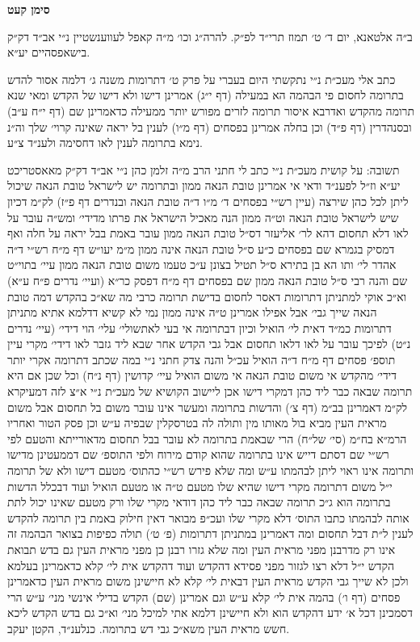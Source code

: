 \documentclass[12pt, openany]{book}
\newcommand{\chapname}{}
\newcommand{\newchap}[1]{
	\addcontentsline{toc}{chapter}{#1}
	\renewcommand{\chapname}{#1}
		\begin{center}
			\textbf{%
\fontsize{16pt}{16pt}\selectfont
				#1}
		\end{center}
}
\begin{document}
\newchap{סימן קעט}
\begin{multicols}{2}
ב״ה אלטאנא, יום ד׳ ט׳ תמוז תרי״ד לפ״ק. להרה״ג וכו׳ מ״ה קאפל לעווענשטיין נ״י אב״ד דק״ק בישאפסהיים יע״א.\\\vspace{0pt}

כתב אלי מעכ״ת נ״י נתקשתי היום בעברי על פרק ט׳ דתרומות משנה ג׳ דלמה אסור להדש בתרומה לחסום פי הבהמה הא במעילה (דף י״ג) אמרינן דישו ולא דישו של הקדש ומאי שנא תרומה מהקדש ואדרבא איסור תרומה לזרים מפורש יותר ממעילה כדאמרינן שם (דף י״ח ע״ב) ובסנהדרין (דף פ״ד) וכן בחלה אמרינן בפסחים (דף מ״ו) לענין בל יראה שאינה קרוי׳ שלך וה״נ נימא בתרומה לענין לאו דחסימה ולענ״ד צ״ע.\\\vspace{0pt}

תשובה: על קושית מעכ״ת נ״י כתב לי חתני הרב מ״ה זלמן כהן נ״י אב״ד דק״ק מאאסטריכט יע״א וז״ל לפענ״ד ודאי אי אמרינן טובת הנאה ממון ובתרומה יש לישראל טובת הנאה שיכול ליתן לכל כהן שירצה (עיין רש״י בפסחים ד׳ מ״ו ד״ה טובת הנאה ובנדרים דף פ״ז) לק״מ דכיון שיש לישראל טובת הנאה וט״ה ממון הנה מאכיל הישראל את פרתו מדידי׳ ומש״ה עובר על לאו דלא תחסום דהא לר׳ אליעזר דס״ל טובת הנאה ממון עובר באמת בבל יראה על חלה ואף דמסיק בגמרא שם בפסחים כ״ע ס״ל טובת הנאה אינה ממון מ״מ יעו״ש דף מ״ח רש״י ד״ה אהדר לי׳ ותו הא בן בתירא ס״ל תטיל בצונן ע״כ טעמו משום טובת הנאה ממון עיי׳ בתוי״ט שם והנה רבי ס״ל טובת הנאה ממון שם בפסחים דף מ״ח דפסק כר״א (ועיי׳ נדרים פ״ח ע״א) וא״כ אוקי למתניתן דתרומות דאסר לחסום בדישת תרומה כרבי מה שא״כ בהקדש דמה טובת הנאה שייך גבי׳ אבל אפילו אמרינן ט״ה אינה ממון נמי לא קשיא דדלמא אתיא מתניתן דתרומות כמ״ד דאית לי׳ הואיל וכיון דבתרומה אי בעי לאתשולי׳ עלי׳ הוי דידי׳ (עיי׳ נדרים נ״ט) לפיכך עובר על לאו דלאו תחסום אבל גבי הקדש אחר שבא ליד גזבר לאו דידי׳ מקרי עיין תוספ׳ פסחים דף מ״ח ד״ה הואיל עכ״ל והנה צדק חתני נ״י במה שכתב דתרומה אקרי יותר דידי׳ מהקדש אי משום טובת הנאה אי משום הואיל עיי׳ קדושין (דף נ״ח) וכל שכן אם היא תרומה שבאה כבר ליד כהן דמקרי דישו אכן ליישוב הקושיא של מעכ״ת נ״י א״צ לזה דמעיקרא לק״מ דאמרינן בב״מ (דף צ׳) והדשות בתרומה ומעשר אינו עובר משום בל תחסום אבל משום מראית העין מביא בול מאותו מין ותולה לה בטרסקלין שבפיה ע״ש וכן פסק הטור ואחריו הרמ״א בח״מ (סי׳ של״ח) הרי שבאמת בתרומה לא עובר בבל תחסום מדאורייתא והטעם לפי רש״י שם דסתם דייש אינו בתרומה שהוא קודם מירוח ולפי התוספ׳ שם דממעטינן מדישו ותרומה אינו ראוי ליתן לבהמתו ע״ש ומה שלא פירש רש״י כהתוס׳ מטעם דישו ולא של תרומה י״ל משום דתרומה מקרי דישו שהיא שלו מטעם ט״ה או מטעם הואיל ועוד דבכלל הדשות בתרומה הוא ג״כ תרומה שבאה כבר ליד כהן דודאי מקרי שלו ורק מטעם שאינו יכול לתת אותה לבהמתו כתבו התוס׳ דלא מקרי שלו ועכ״פ מבואר דאין חילוק באמת בין תרומה להקדש לענין ל״ת דבל תחסום ומה דאמרינן במתניתן דתרומות (פ׳ ט׳) תולה כפיפות בצואר הבהמה זה אינו רק מדרבנן מפני מראית העין ומה שלא גזרו רבנן כן מפני מראית העין גם בדש תבואת הקדש י״ל דלא רצו לגזור מפני פסידא דהקדש ועוד דהקדש אית לי׳ קלא כדאמרינן בעלמא ולכן לא שייך גבי הקדש מראית העין דבאית לי׳ קלא לא חיישינן משום מראית העין כדאמרינן פסחים (דף ו׳) בהמה אית לי׳ קלא ע״ש וגם אמרינן (שם) הקדש בדילי אינשי מני׳ ע״ש הרי דסמכינן דכל א׳ ידע דהקדש הוא ולא חיישינן דלמא אתי למיכל מני׳ וא״כ גם בדש הקדש ליכא חשש מראית העין משא״כ גבי דש בתרומה. כנלענ״ד, הקטן יעקב.\\\vspace{0pt}


\end{multicols}
\end{document}
